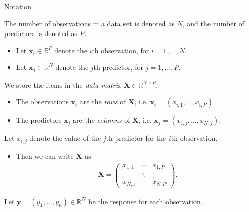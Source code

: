 \documentclass[8pt]{beamer}
\newcommand{\mys}{\vspace{0.5cm} %
}
\begin{document}
\begin{frame}{\color{white} Notation}

The number of observations in a data set is denoted as $N$, and the number of predictors is denoted as $P$.
\begin{itemize}
    \item Let $\bm{x}_i \in \mathbb{R}^P$ denote the $i$th observation, for $i = 1, \ldots, N$.
    \item Let $\mathbf{x}_j \in \mathbb{R}^N$ denote the $j$th predictor, for $j = 1, \ldots, P$.
\end{itemize} \mys

We store the items in the \textit{data matrix} $\mathbf{X} \in \mathbb{R}^{N \times P}$.
\begin{itemize}
    \item The observations $\bm{x}_i$ are the \textit{rows} of $\mathbf{X}$, i.e. $\bm{x}_i = (x_{i, 1}, \ldots, x_{i, P})$
    \item The predictors $\mathbf{x}_j$ are the \textit{columns} of $\mathbf{X}$, i.e. $\mathbf{x}_j = (x_{1,j}, \ldots, x_{N,j})$.
\end{itemize} \mys

Let $x_{i,j}$ denote the value of the $j$th predictor for the $i$th observation.
\begin{itemize}
    \item Then we can write $\mathbf{X}$ as 
    \begin{align*}
        \mathbf{X} = \begin{pmatrix}
        x_{1,1} & \cdots & x_{1,P} \\
        \vdots & \ddots & \vdots \\
        x_{N,1} & \cdots & x_{N,P}
        \end{pmatrix}.
    \end{align*}
\end{itemize} \mys

Let $\mathbf{y} = (y_1, \ldots, y_n) \in \mathbb{R}^N$ be the response for each observation.
    
\end{frame}
\end{document}
